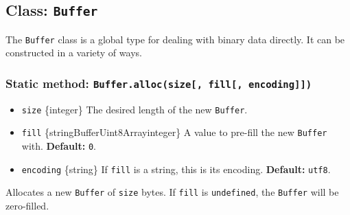 \subsection{\texorpdfstring{Class:
\texttt{Buffer}}{Class: Buffer}}\label{class-buffer}

The \texttt{Buffer} class is a global type for dealing with binary data
directly. It can be constructed in a variety of ways.

\subsubsection{\texorpdfstring{Static method:
\texttt{Buffer.alloc(size{[},\ fill{[},\ encoding{]}{]})}}{Static method: Buffer.alloc(size{[}, fill{[}, encoding{]}{]})}}\label{static-method-buffer.allocsize-fill-encoding}

\begin{itemize}
\tightlist
\item
  \texttt{size} \{integer\} The desired length of the new
  \texttt{Buffer}.
\item
  \texttt{fill}
  \{string\textbar Buffer\textbar Uint8Array\textbar integer\} A value
  to pre-fill the new \texttt{Buffer} with. \textbf{Default:}
  \texttt{0}.
\item
  \texttt{encoding} \{string\} If \texttt{fill} is a string, this is its
  encoding. \textbf{Default:}
  \texttt{\textquotesingle{}utf8\textquotesingle{}}.
\end{itemize}

Allocates a new \texttt{Buffer} of \texttt{size} bytes. If \texttt{fill}
is \texttt{undefined}, the \texttt{Buffer} will be zero-filled.

\begin{Shaded}
\begin{Highlighting}[]
\NormalTok{ \{ }\NormalTok{ \} } \OperatorTok{;}

\OperatorTok{=} \NormalTok{(}\NormalTok{)}\OperatorTok{;}

\OperatorTok{;}
\end{Highlighting}
\end{Shaded}

